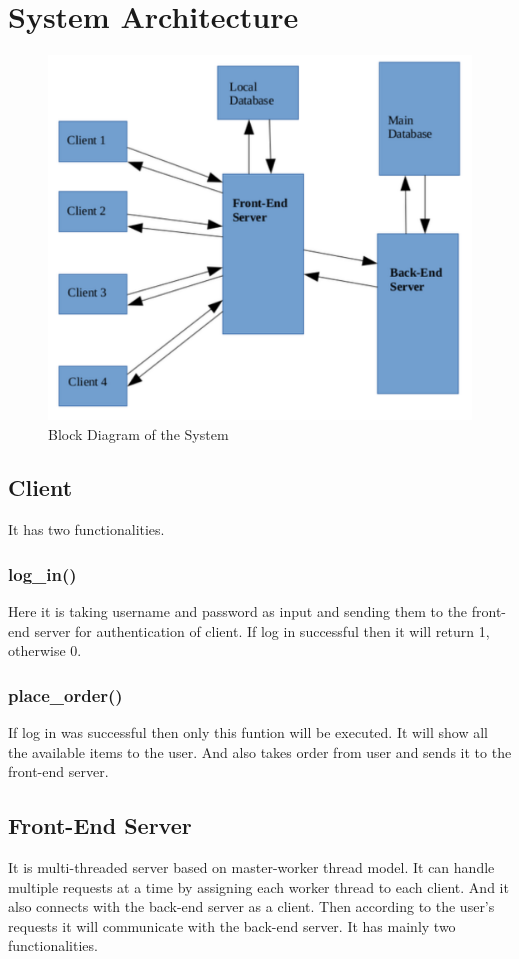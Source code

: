 \documentclass[11pt]{article}
\begin{document}
	\section{\label{section:sysarch}System Architecture}
		\begin{figure}[h]
			\begin{center}
				\includegraphics[scale=0.5]{block_diagram.pdf}
				\caption{\label{fig:architecture} Block Diagram of the System}
			\end{center}
		\end{figure}
		\subsection{Client}
			It has two functionalities.
			\subsubsection{log\_in()}
				Here it is taking username and password as input and
				sending them to the front-end server for authentication of client. If log in successful then it will return 1, otherwise 0.
			\subsubsection{place\_order()}
				If log in was successful then only this funtion
				will be executed. It will show all the available items to the user. And also takes order from user and sends it to the front-end server.
		\subsection{Front-End Server}
			It is multi-threaded server based on master-worker thread
			model. It can handle multiple requests at a time by assigning each worker thread to each client. And it also connects with the back-end server as a client. Then according to the user’s requests it will communicate with the back-end server. It has mainly two functionalities.
\end{document}
